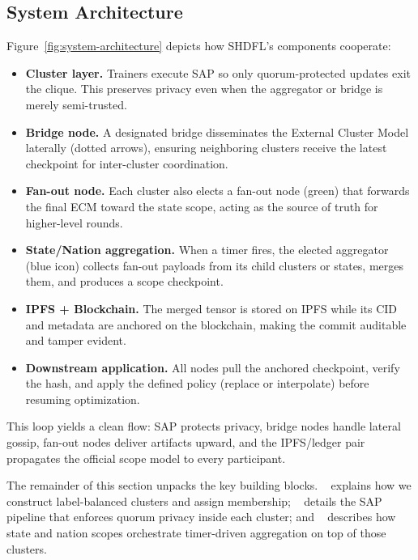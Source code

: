 \subsection{System Architecture}
\label{sec:system-architecture}

Figure~\ref{fig:system-architecture} depicts how SHDFL’s components cooperate:
\begin{itemize}
    \item \textbf{Cluster layer.} Trainers execute SAP so only quorum-protected updates exit the clique. This preserves privacy even when the aggregator or bridge is merely semi-trusted.
    \item \textbf{Bridge node.} A designated bridge disseminates the External Cluster Model laterally (dotted arrows), ensuring neighboring clusters receive the latest checkpoint for inter-cluster coordination.
    \item \textbf{Fan-out node.} Each cluster also elects a fan-out node (green) that forwards the final ECM toward the state scope, acting as the source of truth for higher-level rounds.
    \item \textbf{State/Nation aggregation.} When a timer fires, the elected aggregator (blue icon) collects fan-out payloads from its child clusters or states, merges them, and produces a scope checkpoint.
    \item \textbf{IPFS + Blockchain.} The merged tensor is stored on IPFS while its CID and metadata are anchored on the blockchain, making the commit auditable and tamper evident.
    \item \textbf{Downstream application.} All nodes pull the anchored checkpoint, verify the hash, and apply the defined policy (replace or interpolate) before resuming optimization.
\end{itemize}
This loop yields a clean flow: SAP protects privacy, bridge nodes handle lateral gossip, fan-out nodes deliver artifacts upward, and the IPFS/ledger pair propagates the official scope model to every participant.

The remainder of this section unpacks the key building blocks. ~ explains how we construct label-balanced clusters and assign membership; ~ details the SAP pipeline that enforces quorum privacy inside each cluster; and ~ describes how state and nation scopes orchestrate timer-driven aggregation on top of those clusters.
